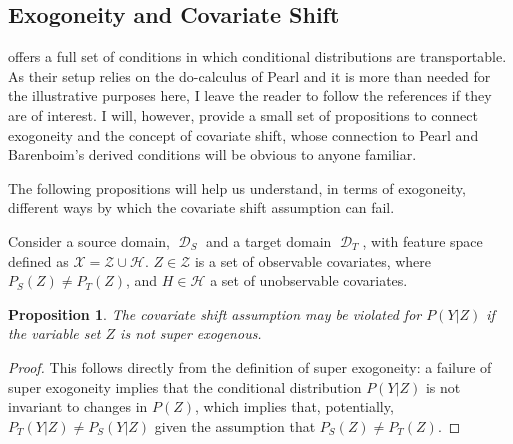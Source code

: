 \documentclass[a4paper,12pt]{article}
\newtheorem{prop}{Proposition}
\DeclareMathOperator*{\D}{\mathcal{D}}
\begin{document}



\subsection{ Exogoneity and Covariate Shift}

\cite{Pearl2014} offers a full set of conditions in which conditional distributions are transportable. As their setup relies on the do-calculus of Pearl \parencite*{Pearl2000} and it is more than needed for the illustrative purposes here, I leave the reader to follow the references if they are of interest. I will, however, provide a small set of propositions to connect exogoneity and the concept of covariate shift, whose connection to Pearl and Barenboim's derived conditions will be obvious to anyone familiar.

The following propositions will help us understand, in terms of exogoneity, different ways by which the covariate shift assumption can fail.

Consider a source domain, $\D_S$ and a target domain $\D_T$, with feature space defined as $\mathcal{X} = \mathcal{Z} \cup \mathcal{H}$. $Z \in \mathcal{Z}$ is a set of observable covariates, where $P_S(Z) \neq P_T(Z)$, and $H \in \mathcal{H}$ a set of unobservable covariates.

\begin{prop}
  The covariate shift assumption may be violated for $P(Y|Z)$ if the variable set $Z$ is not super exogenous.
\end{prop}

\begin{proof}
  This follows directly from the definition of super exogoneity: a failure of super exogoneity implies that the conditional distribution $P(Y|Z)$ is not invariant to changes in $P(Z)$, which implies that, potentially, $P_T(Y|Z) \neq P_S(Y|Z)$ given the assumption that $P_S(Z) \neq P_T(Z)$.
\end{proof}
\end{document}
